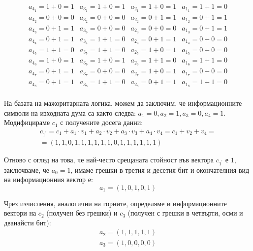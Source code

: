 \documentclass{report}
\begin{document}
\[
\begin{array}{cccc}
a_{4_1} = 1 + 0 = 1 & a_{3_1} = 1 + 0 = 1 & a_{2_1} = 1 + 0 = 1 & a_{1_1} = 1 + 1 = 0 \\
a_{4_2} = 0 + 0 = 0 & a_{3_2} = 0 + 0 = 0 & a_{2_2} = 0 + 1 = 1 & a_{1_2} = 0 + 1 = 1 \\
a_{4_3} = 0 + 1 = 1 & a_{3_3} = 0 + 0 = 0 & a_{2_3} = 0 + 0 = 0 & a_{1_3} = 0 + 1 = 1 \\
a_{4_4} = 0 + 1 = 1 & a_{3_4} = 1 + 1 = 0 & a_{2_4} = 0 + 1 = 1 & a_{1_4} = 0 + 0 = 0 \\
a_{4_5} = 1 + 1 = 0 & a_{3_5} = 1 + 1 = 0 & a_{2_5} = 1 + 0 = 1 & a_{1_5} = 0 + 0 = 0 \\
a_{4_6} = 1 + 0 = 1 & a_{3_6} = 1 + 0 = 1 & a_{2_6} = 1 + 1 = 0 & a_{1_6} = 1 + 1 = 0 \\
a_{4_7} = 0 + 1 = 1 & a_{3_7} = 0 + 0 = 0 & a_{2_7} = 1 + 0 = 1 & a_{1_7} = 0 + 0 = 0 \\
a_{4_8} = 0 + 1 = 1 & a_{3_8} = 1 + 1 = 0 & a_{2_8} = 0 + 1 = 1 & a_{1_8} = 1 + 1 = 0 \\
\end{array}
\]

На базата на мажоритарната логика, можем да заключим, че информационните символи на изходната дума са както следва: $a_1=0, a_2=1, a_3=0, a_4=1$. Модифицираме $c_1$ с получените досега данни: 
\[
\begin{array}{c}
c_{1^\prime} = c_1 + a_1 \cdot v_1 + a_2 \cdot v_2 + a_3 \cdot v_3 + a_4 \cdot v_4 = c_1 + v_2 + v_4 = \\
= \left( 1, 1, 0, 1, 1, 1, 1, 1, 1, 0, 1, 1, 1, 1, 1, 1 \right)
\end{array}
\]

Отново с оглед на това, че най-често срещаната стойност във вектора $c_{1^\prime}$ е $1$, заключваме, че $a_0 = 1$, имаме грешки в третия и десетия бит и окончателния вид на информационния вектор е:
\[
a_1 = \left( 1, 0, 1, 0, 1 \right)
\]

Чрез изчисления, аналогични на горните, определяме и информационните вектори на $c_2$ (получен без грешки) и $c_3$ (получен с грешки в четвърти, осми и дванайсти бит):
\[
\begin{array}{c}
a_2=\left( 1, 1, 1, 1, 1 \right) \\
a_3=\left( 1, 0, 0, 0, 0 \right)
\end{array}
\]
\end{document}
